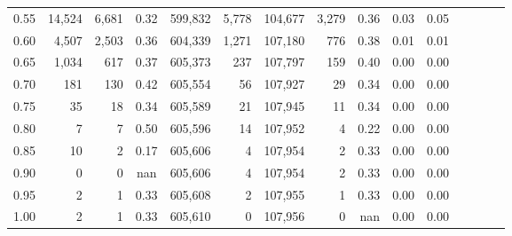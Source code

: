 \begin{tabular}{rrrcrrrrrrrrrrr}
0.55 &   14,524 &   6,681 &                                       0.32 &  599,832 &    5,778 &  104,677 &    3,279 &  0.36 &  0.03 &                         0.05 \\
0.60 &    4,507 &   2,503 &                                       0.36 &  604,339 &    1,271 &  107,180 &      776 &  0.38 &  0.01 &                         0.01 \\
0.65 &    1,034 &     617 &                                       0.37 &  605,373 &      237 &  107,797 &      159 &  0.40 &  0.00 &                         0.00 \\
0.70 &      181 &     130 &                                       0.42 &  605,554 &       56 &  107,927 &       29 &  0.34 &  0.00 &                         0.00 \\
0.75 &       35 &      18 &                                       0.34 &  605,589 &       21 &  107,945 &       11 &  0.34 &  0.00 &                         0.00 \\
0.80 &        7 &       7 &                                       0.50 &  605,596 &       14 &  107,952 &        4 &  0.22 &  0.00 &                         0.00 \\
0.85 &       10 &       2 &                                       0.17 &  605,606 &        4 &  107,954 &        2 &  0.33 &  0.00 &                         0.00 \\
0.90 &        0 &       0 &                                        nan &  605,606 &        4 &  107,954 &        2 &  0.33 &  0.00 &                         0.00 \\
0.95 &        2 &       1 &                                       0.33 &  605,608 &        2 &  107,955 &        1 &  0.33 &  0.00 &                         0.00 \\
1.00 &        2 &       1 &                                       0.33 &  605,610 &        0 &  107,956 &        0 &   nan &  0.00 &                         0.00 \\
\bottomrule
\end{tabular}
